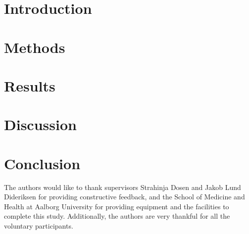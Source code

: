 \documentclass[journal]{IEEEtran}
\begin{document}
\IEEEpeerreviewmaketitle

\section{Introduction}
 

\section{Methods} \label{meth:pap}





%

















\section{Results} \label{res:pap}



\section{Discussion} \label{dis:pap}



\section{Conclusion} \label{con:pap}



\appendix[Acknowledgement]
The authors would like to thank supervisors Strahinja Dosen and Jakob Lund Dideriksen for providing constructive feedback, and the School of Medicine and Health at Aalborg University for providing equipment and the facilities to complete this study. Additionally, the authors are very thankful for all the voluntary participants. 


\end{document}
